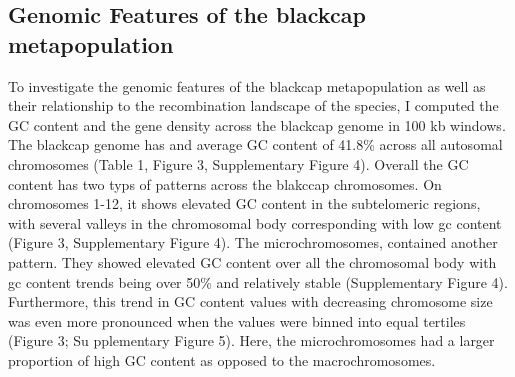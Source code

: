 \documentclass[12pt,a4paper]{article}
\begin{document}
\subsection{Genomic Features of the blackcap metapopulation}

To investigate the genomic features of the blackcap metapopulation as well as their
relationship to the recombination landscape of the species, I computed the GC content and
the gene density across the blackcap genome in 100 kb windows. The blackcap genome has and
average GC content of 41.8\% across all autosomal chromosomes (Table 1, Figure 3, Supplementary Figure 4).
Overall the GC content has two typs of patterns across the blakccap chromosomes.
On chromosomes 1-12, it shows elevated GC content in the subtelomeric regions, with several valleys
in the chromosomal body corresponding with low gc content (Figure 3, Supplementary Figure 4).
The microchromosomes, contained another pattern. They showed elevated GC content over all
the chromosomal body with gc content trends being over 50\% and relatively stable
(Supplementary Figure 4). Furthermore, this trend in GC content values with decreasing
chromosome size was even more pronounced when the values were binned into equal tertiles (Figure 3; Su
pplementary Figure 5). Here, the microchromosomes had a larger proportion of high GC
content as opposed to the macrochromosomes. \\
\end{document}
